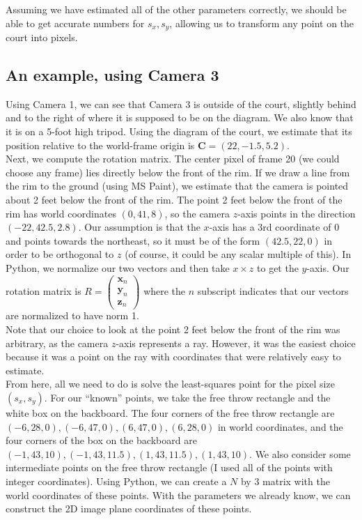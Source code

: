 \documentclass{article}
\renewcommand{\vec}[1]{\mathbf{#1}}
\begin{document}
Assuming we have estimated all of the other parameters correctly, we should be able to get accurate numbers for $s_x, s_y$, allowing us to transform any point on the court into pixels.

\subsection{An example, using Camera 3}
Using Camera 1, we can see that Camera 3 is outside of the court, slightly behind and to the right of where it is supposed to be on the diagram. 
We also know that it is on a 5-foot high tripod. 
Using the diagram of the court, we estimate that its position relative to the world-frame origin is $\bm{C}=(22, -1.5, 5.2)$. \\

Next, we compute the rotation matrix. The center pixel of frame 20 (we could choose any frame) lies directly below the front of the rim. 
If we draw a line from the rim to the ground (using MS Paint), we estimate that the camera is pointed about 2 feet below the front of the rim. 
The point 2 feet below the front of the rim has world coordinates $(0, 41, 8)$, so the camera $z$-axis points in the direction $(-22, 42.5, 2.8)$.
 Our assumption is that the $x$-axis has a 3rd coordinate of 0 and points towards the northeast, so it must be of the form $(42.5, 22, 0)$ 
 in order to be orthogonal to $z$ (of course, it could be any scalar multiple of this). 
 In Python, we normalize our two vectors and then take $x\times z$ to get the $y$-axis. 
 Our rotation matrix is $R=\begin{pmatrix} \vec{x}_n \\ \vec{y}_n \\ \vec{z}_n \end{pmatrix}$ where the $n$ subscript indicates that our vectors are normalized to have norm 1. \\

Note that our choice to look at the point 2 feet below the front of the rim was arbitrary, as the camera $z$-axis represents a ray. 
However, it was the easiest choice because it was a point on the ray with coordinates that were relatively easy to estimate. \\

From here, all we need to do is solve the least-squares point for the pixel size $(s_x, s_y)$. 
For our ``known'' points, we take the free throw rectangle and the white box on the backboard. 
The four corners of the free throw rectangle are $(-6, 28, 0), (-6, 47, 0), (6, 47, 0), (6, 28, 0)$ in world coordinates, 
and the four corners of the box on the backboard are $(-1, 43, 10), (-1, 43, 11.5), (1, 43, 11.5), (1, 43, 10)$. 
We also consider some intermediate points on the free throw rectangle (I used all of the points with integer coordinates). 
Using Python, we can create a $N$ by 3 matrix with the world coordinates of these points. 
With the parameters we already know, we can construct the 2D image plane coordinates of these points. \\
\end{document}
